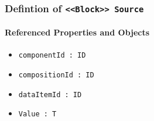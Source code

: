 \subsubsection{Defintion of \texttt{<<Block>> Source}}
  \label{type:Source}

\FloatBarrier



\FloatBarrier
\paragraph{Referenced Properties and Objects}

\begin{itemize}
\item \texttt{componentId : ID}

\item \texttt{compositionId : ID}

\item \texttt{dataItemId : ID}

\item \texttt{Value : T}

\end{itemize}
\FloatBarrier
